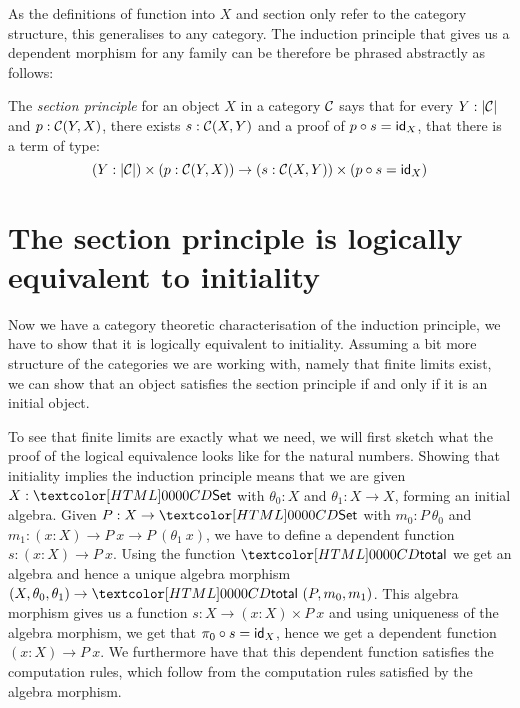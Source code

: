 As the definitions of function into $X$ and section only refer to the
category structure, this generalises to any category. The induction
principle that gives us a dependent morphism for any family can be
therefore be phrased abstractly as follows:

\begin{definition}
  The \emph{section principle} for an object $X$ in a category $\mathcal{C}$
  says that for every $Y : | \mathcal{C} |$ and $p : \mathcal{C}(Y,X)$, there exists
  $s : \mathcal{C}(X,Y)$ and a proof of $p \circ s = \id_X$, \ie that there is
  a term of type:
  \[
    (Y : | \Cc |) \times (p : \Cc(Y,X)) \to (s : \Cc(X,Y)) \times (p \circ s = \id_X)
  \]
\end{definition}

\section{The section principle is logically equivalent to initiality}

Now we have a category theoretic characterisation of the induction
principle, we have to show that it is logically equivalent to
initiality. Assuming a bit more structure of the categories we are
working with, namely that finite limits exist, we can show that an
object satisfies the section principle if and only if it is an initial
object.

To see that finite limits are exactly what we need, we will first
sketch what the proof of the logical equivalence looks like for the
natural numbers. Showing that initiality implies the induction
principle means that we are given $X : \Set$ with $\theta_0 : X$ and
$\theta_1 : X \to X$, forming an initial algebra. Given
$P : X \to \Set$ with $m_0 : P\ \theta_0$ and
$m_1 : (x : X) \to P\ x \to P\ (\theta_1\ x)$, we have to define a
dependent function $s : (x : X) \to P\ x$. Using the function $\total$
we get an algebra and hence a unique algebra morphism
$(X,\theta_0,\theta_1) \to \total\ (P,m_0,m_1)$. This algebra morphism
gives us a function $s : X \to (x : X) \times P\ x$ and using
uniqueness of the algebra morphism, we get that
$\pi_0 \circ s = \id_X$, hence we get a dependent function
$(x : X) \to P\ x$. We furthermore have that this dependent function
satisfies the computation rules, which follow from the computation
rules satisfied by the algebra morphism.

